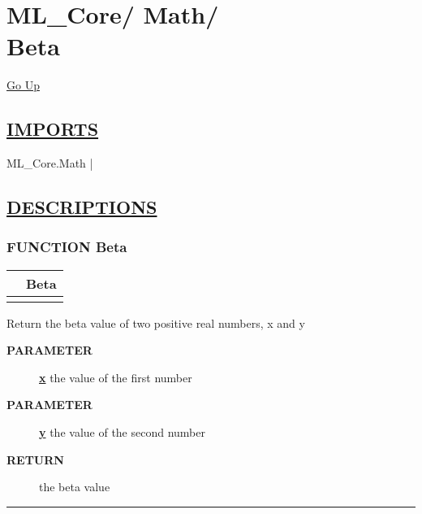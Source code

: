 \chapter*{\color{headfile}
{\large ML\_Core\slash\hspace{0pt}}
{\large Math\slash\hspace{0pt}}
 \\
Beta
}
\hypertarget{ecldoc:toc:ML_Core.Math.Beta}{}
\hyperlink{ecldoc:toc:root/ML_Core/Math}{Go Up}

\section*{\underline{\textsf{IMPORTS}}}
\begin{doublespace}
{\large
ML\_Core.Math |
}
\end{doublespace}

\section*{\underline{\textsf{DESCRIPTIONS}}}
\subsection*{\textsf{\colorbox{headtoc}{\color{white} FUNCTION}
Beta}}

\hypertarget{ecldoc:ml_core.math.beta}{}

{\renewcommand{\arraystretch}{1.5}
\begin{tabularx}{\textwidth}{|>{\raggedright\arraybackslash}l|X|}
\hline
\hspace{0pt}\mytexttt{\color{red} } & \textbf{Beta} \\
\hline
\multicolumn{2}{|>{\raggedright\arraybackslash}X|}{\hspace{0pt}\mytexttt{\color{param} (REAL8 x, REAL8 y)}} \\
\hline
\end{tabularx}
}

\par
Return the beta value of two positive real numbers, x and y

\par
\begin{description}
\item [\colorbox{tagtype}{\color{white} \textbf{\textsf{PARAMETER}}}] \textbf{\underline{x}} the value of the first number
\item [\colorbox{tagtype}{\color{white} \textbf{\textsf{PARAMETER}}}] \textbf{\underline{y}} the value of the second number
\item [\colorbox{tagtype}{\color{white} \textbf{\textsf{RETURN}}}] \textbf{\underline{}} the beta value
\end{description}

\rule{\linewidth}{0.5pt}
